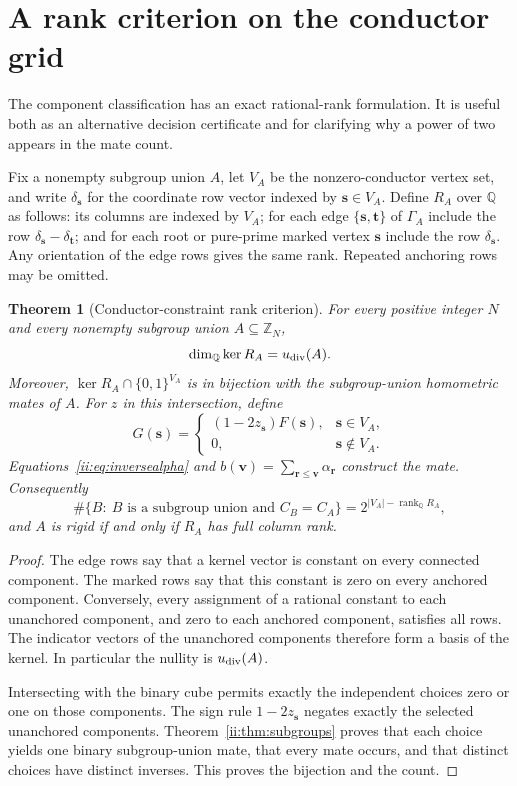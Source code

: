 \documentclass[11pt]{article}
\numberwithin{equation}{section}
\newtheorem{theorem}{Theorem}[section]
\theoremstyle{definition}
\theoremstyle{remark}
\newcommand{\s}{\boldsymbol{s}}
\newcommand{\rvec}{\boldsymbol{r}}
\newcommand{\vv}{\boldsymbol{v}}
\begin{document}
\section{A rank criterion on the conductor grid}\label{v2:sec:rank}
The component classification has an exact rational-rank formulation. It is useful both as an alternative decision certificate and for clarifying why a power of two appears in the mate count.

Fix a nonempty subgroup union $A$, let $V_A$ be the nonzero-conductor vertex set, and write $\delta_{\s}$ for the coordinate row vector indexed by $\s\in V_A$. Define $R_A$ over $\mathbb Q$ as follows: its columns are indexed by $V_A$; for each edge $\{\s,\mathbf t\}$ of $\Gamma_A$ include the row $\delta_{\s}-\delta_{\mathbf t}$; and for each root or pure-prime marked vertex $\s$ include the row $\delta_{\s}$. Any orientation of the edge rows gives the same rank. Repeated anchoring rows may be omitted.

\begin{theorem}[Conductor-constraint rank criterion]\label{v2:thm:rank}
For every positive integer $N$ and every nonempty subgroup union $A\subseteq\mathbb Z_N$,
\[
 \dim_{\mathbb Q}\ker R_A=u_{\rm div}(A).
\]
Moreover, $\ker R_A\cap\{0,1\}^{V_A}$ is in bijection with the subgroup-union homometric mates of $A$. For $z$ in this intersection, define
\[
 G(\s)=\begin{cases}
       (1-2z_{\s})F(\s),&\s\in V_A,\\
       0,&\s\notin V_A.
       \end{cases}
\]
Equations~\eqref{ii:eq:inversealpha} and $b(\vv)=\sum_{\rvec\leq\vv}\alpha_{\rvec}$ construct the mate. Consequently
\[
 \#\{B:\ B\text{ is a subgroup union and }C_B=C_A\}
   =2^{|V_A|-\operatorname{rank}_{\mathbb Q}R_A},
\]
and $A$ is rigid if and only if $R_A$ has full column rank.
\end{theorem}
\begin{proof}
The edge rows say that a kernel vector is constant on every connected component. The marked rows say that this constant is zero on every anchored component. Conversely, every assignment of a rational constant to each unanchored component, and zero to each anchored component, satisfies all rows. The indicator vectors of the unanchored components therefore form a basis of the kernel. In particular the nullity is $u_{\rm div}(A)$.

Intersecting with the binary cube permits exactly the independent choices zero or one on those components. The sign rule $1-2z_{\s}$ negates exactly the selected unanchored components. Theorem~\ref{ii:thm:subgroups} proves that each choice yields one binary subgroup-union mate, that every mate occurs, and that distinct choices have distinct inverses. This proves the bijection and the count.
\end{proof}
\end{document}
